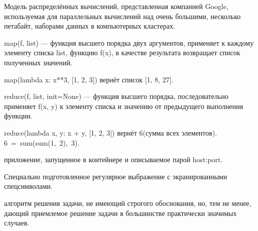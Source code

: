 \begin{definition}[MapReduce]
  Модель распределённых вычислений, представленная
  компанией Google, используемая для параллельных вычислений над очень
  большими, несколько петабайт, наборами данных в компьютерных кластерах.
\end{definition}

\begin{definition}[Map]
  map(f, list) --- функция высшего порядка двух аргументов, применяет к каждому
  элементу списка list, функцию f(x), в качестве результата возвращает список
  полученных значений.
\end{definition}

\begin{example}
  map(lambda x: x**3, [1, 2, 3]) вернёт список [1, 8, 27].
\end{example}

\begin{definition}[Reduce]
  reduce(f, list, init=None) --- функция высшего порядка, последовательно
  применяет f(x, y) к элементу списка и значению от предыдущего выполнения
  функции.
\end{definition}

\begin{example}
  reduce(lambda x, y: x + y, [1, 2, 3]) вернёт 6(сумма всех элементов).
  6~=~sum(sum(1,~2),~3).
\end{example}

\begin{definition}[Экземпляр]
  приложение, запущенное в контейнере и описываемое парой host:port.
\end{definition}
\begin{definition}[Шаблон]
  Специально подготовленное регулярное выбражение с экранированными
  спецсимволами.
\end{definition}
\begin{definition}
алгоритм решения задачи, не имеющий строгого обоснования, но, тем не менее, дающий приемлемое решение задачи в большинстве практически значимых случаев.
\end{definition}
